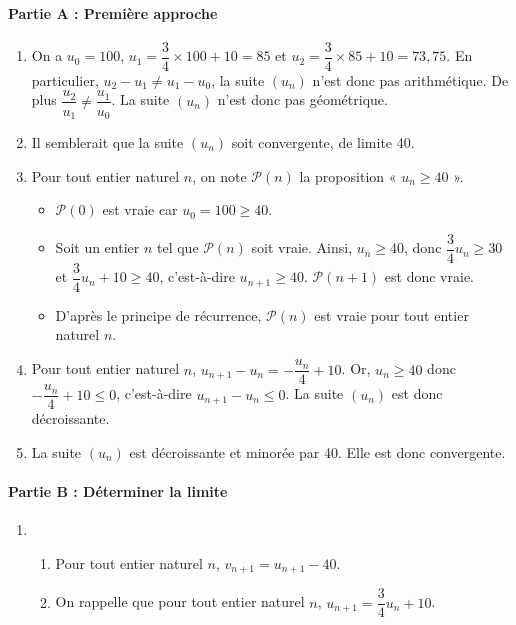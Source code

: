 \documentclass[11pt,fleqn, openany]{book} %
\begin{document}
\begin{solution}\hspace{0pt}
\paragraph{Partie A : Première approche}

\begin{enumerate}
\item On a  $u_0=100$, $u_1=\dfrac{3}{4}\times 100 +10 = 85$ et $u_2=\dfrac{3}{4} \times 85 + 10 = 73,75$. En particulier, $u_2-u_1 \neq u_1-u_0$, la suite $(u_n)$ n'est donc pas arithmétique. De plus $\dfrac{u_2}{u_1} \neq \dfrac{u_1}{u_0}$. La suite $(u_n)$ n'est donc pas géométrique.

\item Il semblerait que la suite $(u_n)$ soit convergente, de limite 40.

\item Pour tout entier naturel $n$, on note $\mathcal{P}(n)$ la proposition « $u_n\geqslant 40$ ».
\begin{itemize}
\item $\mathcal{P}(0)$ est vraie car $u_0=100\geqslant 40$.
\item Soit un entier $n$ tel que $\mathcal{P}(n)$ soit vraie. Ainsi, $u_n \geqslant 40$, donc $\dfrac{3}{4}u_n \geqslant 30$ et $\dfrac{3}{4}u_n+10 \geqslant 40$, c'est-à-dire $u_{n+1} \geqslant 40$. $\mathcal{P}(n+1)$ est donc vraie.
\item D'après le principe de récurrence, $\mathcal{P}(n)$ est vraie pour tout entier naturel $n$.
\end{itemize}

\item Pour tout entier naturel $n$, $u_{n+1}-u_n=-\dfrac{u_n}{4}+10$. Or, $u_n \geqslant 40$ donc $-\dfrac{u_n}{4}+10 \leqslant 0$, c'est-à-dire $u_{n+1}-u_n \leqslant 0$.  La suite $(u_n)$ est donc décroissante.
\item La suite $(u_n)$ est décroissante et minorée par 40. Elle est donc convergente.\end{enumerate}


\paragraph{Partie B : Déterminer la limite}


\begin{enumerate}
\item \begin{enumerate}\item Pour tout entier naturel $n$, $v_{n+1}=u_{n+1}-40$. 
\item On rappelle que pour tout entier naturel $n$, $u_{n+1}=\dfrac{3}{4}u_n+10$.


\end{enumerate}
\end{enumerate}
\end{solution}
\end{document}
